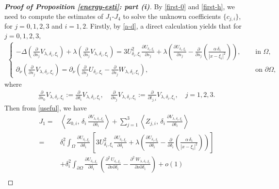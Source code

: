 \documentclass[a4paper,reqno,11pt,oneside]{amsart}
\numberwithin{equation}{section}
\begin{document}
\begin{proof}[\textbf{Proof of Proposition \eqref{energy-esti}: part (i)}]
By \eqref{first-0} and \eqref{first-h}, we need to compute the estimates of $J_1$-$J_4$ to solve the unknown coefficients $\{c_{j,i}\}$, for ${j=0,1,2,3}$ and $i=1,2$. Firstly, by
\eqref{a-d}, a direct calculation yields that for $j=0,1,2,3,$
\begin{align*}
\begin{cases}
    -\Delta \left(\frac{\partial}{\partial s_j} V_{\lambda,\delta_i,\xi_i}\right)+\lambda \left(\frac{\partial}{\partial s_j} V_{\lambda,\delta_i,\xi_i}\right)=3U^{2}_{ {\delta_i}, {\xi_i}}\frac{\partial U_{\delta_i,\xi_i}}{\partial s_j}+\lambda\left(\frac{\partial U_{\delta_i,\xi_i}}{\partial s_j} -\frac{\partial}{\partial s_j}\left(\frac{\alpha\,\delta_i}{|x-\xi_i|^{2}}\right)\right),\quad &\text{ in $\Omega$,}\\
    \partial_{\nu}\left(\frac{\partial}{\partial s_j} V_{\lambda,\delta_i,\xi_i}\right)=\partial_{\nu} \left(\frac{\partial}{\partial s_j} U_{ {\delta_i}, {\xi_i}}-\frac{\partial}{\partial s_j}W_{\lambda,\delta_i,\xi_i}\right),&\text{ on $\partial\Omega$,}
\end{cases}
\end{align*}
where
\begin{align*}
    \frac{\partial}{\partial s_0} V_{\lambda,\delta_i,\xi_i}:=\frac{\partial}{\partial \delta_i} V_{\lambda,\delta_i,\xi_i},\quad\frac{\partial}{\partial s_j} V_{\lambda,\delta_i,\xi_i}:=\frac{\partial}{\partial t_{j,i}} V_{\lambda,\delta_i,\xi_i},\quad j=1,2,3.
\end{align*}
Then from \eqref{useful}, we have
\begin{align*}
   J_{1}=&\left\langle Z_{0,i},\,\delta_i\,\frac{\partial V_{\lambda,\delta_i,\xi_i}}{\partial\delta_i}\right\rangle+\sum_{j=1}^3\left\langle Z_{j,i},\,\delta_i\,\frac{\partial V_{\lambda,\delta_i,\xi_i}}{\partial\delta_i}\right\rangle\\=&\delta_i^2\displaystyle\int_{\Omega}\frac{\partial U_{\delta_i,\xi_i}}{\partial\delta_i}\, \left[3U^{2}_{ {\delta_i}, {\xi_i}}\frac{\partial U_{\delta_i,\xi_i}}{\partial \delta_i} +\lambda\left(\frac{\partial U_{\delta_i,\xi_i}}{\partial \delta_i} -\frac{\partial}{\partial \delta_i}\left(\frac{\alpha\,\delta_i}{|x-\xi_i|^{2}}\right)\right)\right]\\
   &+\delta_i^2\displaystyle\int_{\partial\Omega}\frac{\partial U_{\delta_i,\xi_i} }{\partial\delta_i}\,\left(\frac{\partial^2\,U_{ {\delta_i}, {\xi_i}}}{\partial{\nu} \partial \delta_i} -\frac{\partial^2\,W_{\lambda,\delta_i,\xi_i}}{\partial{\nu}\partial \delta_i}\right)+o(1)\\

\end{align*}
\end{proof}
\end{document}
